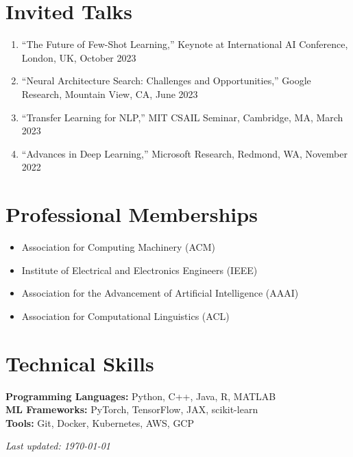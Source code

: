 \documentclass[11pt,letterpaper]{article}
\begin{document}
\section{Invited Talks}

\begin{enumerate}[leftmargin=*]
  \item ``The Future of Few-Shot Learning,'' Keynote at International AI Conference, London, UK, October 2023
  \item ``Neural Architecture Search: Challenges and Opportunities,'' Google Research, Mountain View, CA, June 2023
  \item ``Transfer Learning for NLP,'' MIT CSAIL Seminar, Cambridge, MA, March 2023
  \item ``Advances in Deep Learning,'' Microsoft Research, Redmond, WA, November 2022
\end{enumerate}

\section{Professional Memberships}

\begin{itemize}[leftmargin=*]
  \item Association for Computing Machinery (ACM)
  \item Institute of Electrical and Electronics Engineers (IEEE)
  \item Association for the Advancement of Artificial Intelligence (AAAI)
  \item Association for Computational Linguistics (ACL)
\end{itemize}

\section{Technical Skills}

\textbf{Programming Languages:} Python, C++, Java, R, MATLAB\\
\textbf{ML Frameworks:} PyTorch, TensorFlow, JAX, scikit-learn\\
\textbf{Tools:} Git, Docker, Kubernetes, AWS, GCP

\vspace{0.5cm}

\begin{center}
\textit{Last updated: \today}
\end{center}
\end{document}
